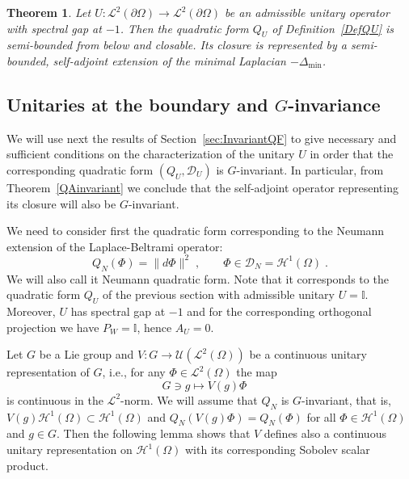 \documentclass[a4paper,12pt]{amsart}
\renewcommand{\L}{\mathcal{L}}
\newcommand{\D}{\mathcal{D}}
\newcommand{\pO}{{\partial \Omega}}
\newcommand{\1}{\mathbb{I}}
\newtheorem{theorem}{Theorem}
\numberwithin{equation}{section}
\numberwithin{theorem}{section}
\begin{document}
\begin{theorem}\label{char_U}
Let $U\colon\L^2(\pO)\to\L^2(\pO)$ be an admissible unitary operator with spectral gap at $-1$. 
Then the quadratic form $Q_U$ of Definition~\ref{DefQU} is semi-bounded from below and closable. Its closure 
is represented by a semi-bounded, self-adjoint extension of the minimal Laplacian $-\Delta_{\mathrm{min}}$. 
\end{theorem}
 



\subsection{Unitaries at the boundary and $G$-invariance}\label{subsec:6-2}
We will use next the results of Section~\ref{sec:InvariantQF} 
to give necessary and sufficient conditions on the characterization of the unitary $U$ in order
that the corresponding quadratic form $(Q_U,\D_U)$ is $G$-invariant. In particular, 
from Theorem~\ref{QAinvariant} we conclude 
that the self-adjoint operator representing its closure will also be $G$-invariant.

We need to consider first the quadratic form corresponding to the Neumann extension of the Laplace-Beltrami
operator: 
\[
Q_N(\Phi)=\|d\Phi\|^2 \;,\quad\quad \Phi\in\D_N=\mathcal{H}^1 (\Omega)\;.
\]
We will also call it Neumann quadratic form. Note that it corresponds to the quadratic form 
$Q_U$ of the previous section with admissible unitary $U = \mathbb{I}$. Moreover,
$U$ has spectral gap at $-1$ and for the corresponding orthogonal projection we have 
$P_{W}=\1$, hence $A_U=0$.

Let $G$ be a Lie group and $V\colon G \to \mathcal{U}(\L^2(\Omega))$ be a continuous unitary representation of $G$, 
i.e., for any $\Phi\in \L^2(\Omega)$ the map
\[
 G\ni g\mapsto V(g)\Phi \quad 
\]
is continuous in the $\L^2$-norm. We will assume that $Q_N$ is $G$-invariant, that is, 
$V(g) \mathcal{H}^1(\Omega) \subset \mathcal{H}^1(\Omega)$ 
and $Q_N(V(g) \Phi ) = Q_N(\Phi)$ for all $\Phi \in \mathcal{H}^1(\Omega)$ and $g\in G$. Then the following lemma 
shows that $V$ defines also a continuous unitary representation on $\mathcal{H}^{1}(\Omega)$ with its corresponding
Sobolev scalar product.
\end{document}
